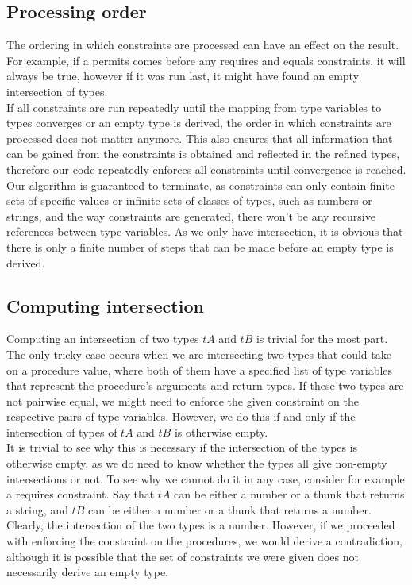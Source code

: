 \documentclass[a4paper]{article}
\begin{document}
\subsection{Processing order}

The ordering in which constraints are processed can have an effect on the result.
For example, if a permits comes before any requires and equals constraints,
it will always be true, however if it was run last, it might have found
an empty intersection of types.\\

If all constraints are run repeatedly until the mapping from type variables
to types converges or an empty type is derived, the order in which constraints are
processed does not matter anymore.
This also ensures that all information that can be gained from the constraints
is obtained and reflected in the refined types, therefore our code repeatedly
enforces all constraints until convergence is reached.\\

Our algorithm is guaranteed to terminate, as constraints can only contain finite sets
of specific values or infinite sets of classes of types, such as numbers or strings,
and the way constraints are generated, there won't be any recursive references between type
variables.
As we only have intersection, it is obvious that there is only a finite number of steps
that can be made before an empty type is derived.

\subsection{Computing intersection}

Computing an intersection of two types $tA$ and $tB$ is trivial for the most part.
The only tricky case occurs when we are intersecting two types that could take on a procedure
value, where both of them have a specified list of type variables that represent the
procedure's arguments and return types.
If these two types are not pairwise equal, we might need to enforce the given constraint on the
respective pairs of type variables.
However, we do this if and only if the intersection of types of $tA$ and $tB$ is otherwise empty.\\

It is trivial to see why this is necessary if the intersection of the types is otherwise empty,
as we do need to know whether the types all give non-empty intersections or not.
To see why we cannot do it in any case, consider for example a requires constraint.
Say that $tA$ can be either a number or a thunk that returns a string,
and $tB$ can be either a number or a thunk that returns a number.
Clearly, the intersection of the two types is a number.
However, if we proceeded with enforcing the constraint on the procedures,
we would derive a contradiction, although it is possible that the set of constraints
we were given does not necessarily derive an empty type.\\
\end{document}
